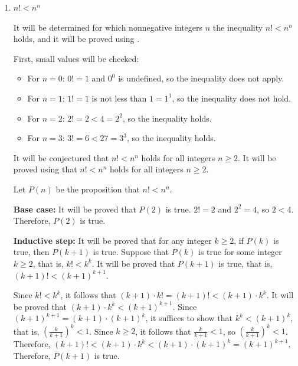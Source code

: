 \begin{enumerate}
\begin{enumerate}
\begin{subprove}
      By , it follows that \(P(n)\) is true for all integers \(n \geq 4\).
      
      Therefore, the inequality \(2^{n} \leq n!\) holds for all nonnegative integers \(n\) with \(n = 0\) or \(n \geq 4\).
    \end{subprove}
    \item \(n! < n^{n}\)
    \begin{subprove}
      It will be determined for which nonnegative integers \(n\) the inequality \(n! < n^{n}\) holds, and it will be proved using .
      
      First, small values will be checked:
      \begin{itemize}
        \item For \(n = 0\): \(0! = 1\) and \(0^{0}\) is undefined, so the inequality does not apply.
        \item For \(n = 1\): \(1! = 1\) is not less than \(1 = 1^{1}\), so the inequality does not hold.
        \item For \(n = 2\): \(2! = 2 < 4 = 2^{2}\), so the inequality holds.
        \item For \(n = 3\): \(3! = 6 < 27 = 3^{3}\), so the inequality holds.
      \end{itemize}
      
      It will be conjectured that \(n! < n^{n}\) holds for all integers \(n \geq 2\).
      It will be proved using  that \(n! < n^{n}\) holds for all integers \(n \geq 2\).
      
      Let \(P(n)\) be the proposition that \(n! < n^{n}\).
      
      \textbf{Base case:} It will be proved that \(P(2)\) is true.
      \(2! = 2\) and \(2^{2} = 4\), so \(2 < 4\).
      Therefore, \(P(2)\) is true.
      
      \textbf{Inductive step:} It will be proved that for any integer \(k \geq 2\), if \(P(k)\) is true, then \(P(k+1)\) is true.
      Suppose that \(P(k)\) is true for some integer \(k \geq 2\), that is, \(k! < k^{k}\).
      It will be proved that \(P(k+1)\) is true, that is, \((k+1)! < (k+1)^{k+1}\).
      
      Since \(k! < k^{k}\), it follows that \((k+1) \cdot k! = (k+1)! < (k+1) \cdot k^{k}\).
      It will be proved that \((k+1) \cdot k^{k} < (k+1)^{k+1}\).
      Since \((k+1)^{k+1} = (k+1) \cdot (k+1)^{k}\), it suffices to show that \(k^{k} < (k+1)^{k}\), that is, \(\left(\frac{k}{k+1}\right)^{k} < 1\).
      Since \(k \geq 2\), it follows that \(\frac{k}{k+1} < 1\), so \(\left(\frac{k}{k+1}\right)^{k} < 1\).
      Therefore, \((k+1)! < (k+1) \cdot k^{k} < (k+1) \cdot (k+1)^{k} = (k+1)^{k+1}\).
      Therefore, \(P(k+1)\) is true.
      

\end{subprove}
\end{enumerate}
\end{enumerate}
